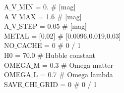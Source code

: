 \begin{tt}
A$\_$V$\_$MIN        = 0.             $\#$ [mag]\\
A$\_$V$\_$MAX        = 1.6            $\#$ [mag]\\
A$\_$V$\_$STEP       = 0.05           $\#$ [mag]\\
METAL          = [0.02]         $\#$ [0.0096,0.019,0.03]\\
NO$\_$CACHE       = 0              $\#$ 0 / 1\\
H0             = 70.0               $\#$ Hubble constant\\
OMEGA$\_$M        = 0.3                $\#$ Omega matter\\
OMEGA$\_$L        = 0.7                $\#$ Omega lambda\\
SAVE$\_$CHI$\_$GRID  = 0          $\#$ 0 / 1\\
\end{tt}